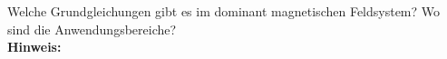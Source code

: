 \begin{question}[section=3,subsection=34,name={Dominant Magnetisch},difficulty=7,type=mdl,mode=exm,tags={}]
	Welche Grundgleichungen gibt es im dominant magnetischen Feldsystem? Wo sind die Anwendungsbereiche?
	\\ \textbf{Hinweis:}\\
	
\end{question}
\begin{solution}
	
\end{solution}